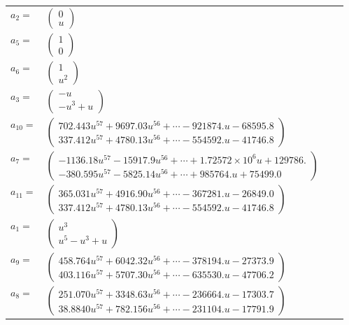 \documentclass[1p]{elsarticle_modified}
\theoremstyle{definition}
\begin{document}
\begin{tabular}{m{7pt} m{180pt} m{7pt} m{180pt} }
\flushright $a_{2}=$&$\begin{pmatrix}0\\u\end{pmatrix}$ \\
\flushright $a_{5}=$&$\begin{pmatrix}1\\0\end{pmatrix}$ \\
\flushright $a_{6}=$&$\begin{pmatrix}1\\u^2\end{pmatrix}$ \\
\flushright $a_{3}=$&$\begin{pmatrix}- u\\- u^3+u\end{pmatrix}$ \\
\flushright $a_{10}=$&$\begin{pmatrix}702.443 u^{57}+9697.03 u^{56}+\cdots-921874. u-68595.8\\337.412 u^{57}+4780.13 u^{56}+\cdots-554592. u-41746.8\end{pmatrix}$ \\
\flushright $a_{7}=$&$\begin{pmatrix}-1136.18 u^{57}-15917.9 u^{56}+\cdots+1.72572\times10^{6} u+129786.\\-380.595 u^{57}-5825.14 u^{56}+\cdots+985764. u+75499.0\end{pmatrix}$ \\
\flushright $a_{11}=$&$\begin{pmatrix}365.031 u^{57}+4916.90 u^{56}+\cdots-367281. u-26849.0\\337.412 u^{57}+4780.13 u^{56}+\cdots-554592. u-41746.8\end{pmatrix}$ \\
\flushright $a_{1}=$&$\begin{pmatrix}u^3\\u^5- u^3+u\end{pmatrix}$ \\
\flushright $a_{9}=$&$\begin{pmatrix}458.764 u^{57}+6042.32 u^{56}+\cdots-378194. u-27373.9\\403.116 u^{57}+5707.30 u^{56}+\cdots-635530. u-47706.2\end{pmatrix}$ \\
\flushright $a_{8}=$&$\begin{pmatrix}251.070 u^{57}+3348.63 u^{56}+\cdots-236664. u-17303.7\\38.8840 u^{57}+782.156 u^{56}+\cdots-231104. u-17791.9\end{pmatrix}$ \\

\end{tabular}
\end{document}
